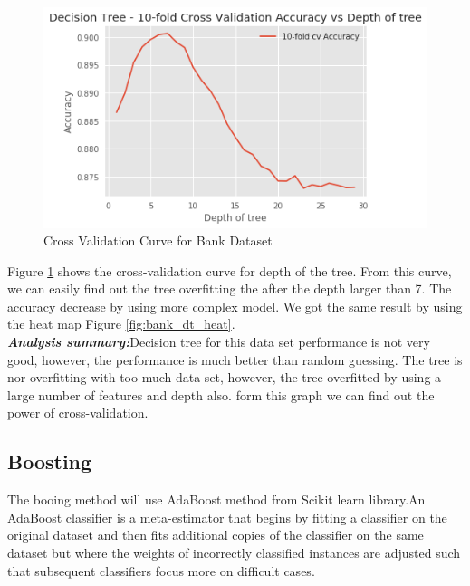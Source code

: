 \documentclass[10pt, conference, compsocconf]{IEEEtran}
\begin{document}
\begin{figure}[h]
	\centering
	\includegraphics[scale = 0.5]{image/Bank_dt_cv.png}
	\caption{Cross Validation Curve for Bank Dataset  }
	\label{fig:bank_dt_cv}
\end{figure}
Figure \ref{fig:bank_dt_cv} shows the cross-validation curve for depth of the tree. From this curve, we can easily find out the tree overfitting the after the depth larger than 7. The accuracy decrease by using more complex model. We got the same result by using the heat map Figure \ref{fig:bank_dt_heat}. \\
\textit{\textbf{Analysis summary:}}Decision tree for this data set performance is not very good, however, the performance is much better than random guessing. The tree is nor overfitting with too much data set, however, the tree overfitted by using a large number of features and depth also. form this graph we can find out the power of cross-validation.

\subsection{Boosting}
The booing method will use AdaBoost method from Scikit learn library.An AdaBoost classifier is a meta-estimator that begins by fitting a classifier on the original dataset and then fits additional copies of the classifier on the same dataset but where the weights of incorrectly classified instances are adjusted such that subsequent classifiers focus more on difficult cases\cite{boost}.
\end{document}
